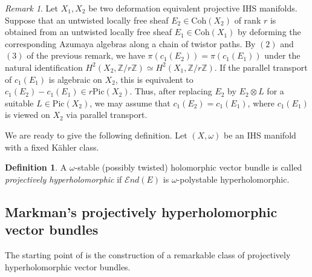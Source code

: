 \documentclass[12pt,a4paper]{amsart}
\theoremstyle{plain}
\theoremstyle{definition}
\newtheorem{df}[thm]{Definition}
\theoremstyle{remark}
\newtheorem{rmk}[thm]{Remark}
\def\Pic{\mathrm{Pic}}
\def\H{H}
\newcommand{\cc}{c}
\begin{document}
\begin{rmk}\label{rmk_trasp_c1}
    Let $X_1,X_2$ be two deformation equivalent projective IHS manifolds. Suppose that an untwisted locally free sheaf $E_2\in\mathrm{Coh}(X_2)$ of rank $r$ is obtained from an untwisted locally free sheaf $E_1\in\mathrm{Coh}(X_1)$ by deforming the corresponding Azumaya algebras along a chain of twistor paths. By $(2)$ and $(3)$ of the previous remark, we have $\pi(\cc_1(E_2))=\pi(\cc_1(E_1))$ under the natural identification $\H^2(X_2,\mathbb{Z}/r\mathbb{Z})\simeq\H^2(X_1,\mathbb{Z}/r\mathbb{Z})$. If the parallel transport of $\cc_1(E_1)$ is algebraic on $X_2$, this is equivalent to $\cc_1(E_2)-\cc_1(E_1)\in r \Pic(X_2)$. Thus, after replacing $E_2$ by $E_2\otimes L$ for a suitable $L\in\Pic(X_2)$,  we may assume that $\cc_1(E_2)=\cc_1(E_1)$, where $\cc_1(E_1)$ is viewed on $X_2$ via parallel transport.
\end{rmk}

We are ready to give the following definition. Let $(X,\omega)$ be an IHS manifold with a fixed K\"ahler class.

\begin{df}
A $\omega$-stable (possibly twisted) holomorphic vector bundle is called \emph{projectively hyperholomorphic} if $\mathcal{E}nd(E)$ is $\omega$-polystable hyperholomorphic.
\end{df}



\subsection{Markman's projectively hyperholomorphic vector bundles} \label{secprojholo} The starting point of \cite{markman} is the construction of a remarkable class of projectively hyperholomorphic vector bundles.
\end{document}

